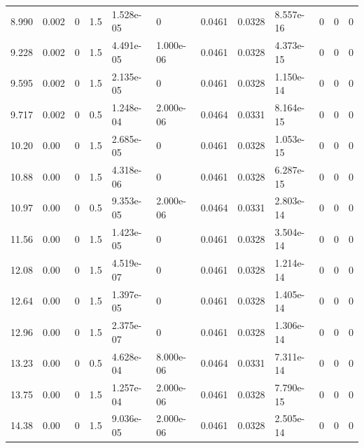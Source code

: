 \documentclass[preview]{standalone}
\begin{document}
{{\begin{tabular}{L{1.2cm}C{1.2cm} C{0.3cm}C{0.5cm} C{1.4cm}C{1.4cm} C{1.4cm}C{1.4cm} C{1.6cm}C{1.6cm} C{1.6cm}C{1.6cm}}
  8.990  &  0.002  & 0     & 1.5 &  1.528e-05  & 0  &  0.0461&   0.0328& 8.557e-16 & 0   &  0 & 0  \\ 
  9.228  &  0.002  & 0     & 1.5 &  4.491e-05  & 1.000e-06  &  0.0461&   0.0328& 4.373e-15 & 0   &  0 & 0  \\ 
  9.595  &  0.002  & 0     & 1.5 &  2.135e-05  & 0  &  0.0461&   0.0328& 1.150e-14 & 0   &  0 & 0  \\ 
  9.717  &  0.002  & 0     & 0.5 &  1.248e-04  & 2.000e-06  &  0.0464&   0.0331& 8.164e-15 & 0   &  0 & 0  \\ 
  10.20  &  0.00  & 0     & 1.5 &  2.685e-05  & 0  &  0.0461&   0.0328& 1.053e-15 & 0   &  0 & 0  \\ 
  10.88  &  0.00  & 0     & 1.5 &  4.318e-06  & 0  &  0.0461&   0.0328& 6.287e-15 & 0   &  0 & 0  \\ 
  10.97  &  0.00  & 0     & 0.5 &  9.353e-05  & 2.000e-06  &  0.0464&   0.0331& 2.803e-14 & 0   &  0 & 0  \\ 
  11.56  &  0.00  & 0     & 1.5 &  1.423e-05  & 0  &  0.0461&   0.0328& 3.504e-14 & 0   &  0 & 0  \\ 
  12.08  &  0.00  & 0     & 1.5 &  4.519e-07  & 0  &  0.0461&   0.0328& 1.214e-14 & 0   &  0 & 0  \\ 
  12.64  &  0.00  & 0     & 1.5 &  1.397e-05  & 0  &  0.0461&   0.0328& 1.405e-14 & 0   &  0 & 0  \\ 
  12.96  &  0.00  & 0     & 1.5 &  2.375e-07  & 0  &  0.0461&   0.0328& 1.306e-14 & 0   &  0 & 0  \\ 
  13.23  &  0.00  & 0     & 0.5 &  4.628e-04  & 8.000e-06  &  0.0464&   0.0331& 7.311e-14 & 0   &  0 & 0  \\ 
  13.75  &  0.00  & 0     & 1.5 &  1.257e-04  & 2.000e-06  &  0.0461&   0.0328& 7.790e-15 & 0   &  0 & 0  \\ 
  14.38  &  0.00  & 0     & 1.5 &  9.036e-05  & 2.000e-06  &  0.0461&   0.0328& 2.505e-14 & 0   &  0 & 0  \\ 
\hline 
\end{tabular} 

}}
\end{document}
